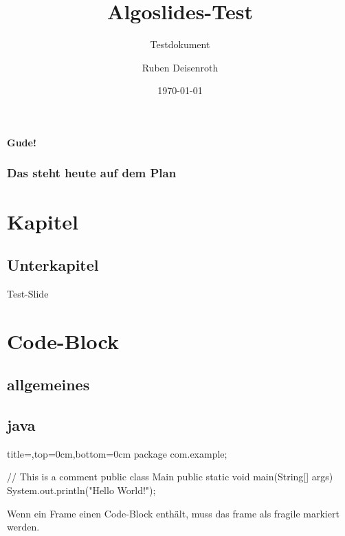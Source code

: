 \documentclass[
    ngerman,
    accentcolor=3b,
    fontsize=12pt,
    a4paper,
    aspectratio=169,
    colorback=true,
    fancy_row_colors,
    leqno,
    fleqn,
    boxarc,
    fleqn,
]{algoslides}
\title{Algoslides-Test}
\subtitle{Testdokument}
\author{Ruben Deisenroth}
\date{\today}
\begin{document}

    \maketitle{}

    \begin{frame}[c]
        \centering\huge\textbf{Gude!}
    \end{frame}

    \begin{frame}
        \frametitle{Das steht heute auf dem Plan}
        \tableofcontents[subsubsectionstyle=hide]
    \end{frame}


    \section{Kapitel}
    \subsection{Unterkapitel}

    \begin{frame}
        \slidehead{}
        Test-Slide
    \end{frame}

    \section{Code-Block} \subsection{allgemeines} \subsection{java}

    \begin{frame}[fragile,c]
        \slidehead{}
        \begin{codeBlock}[]{title=,top=0cm,bottom=0cm}
        package com.example;

        // This is a comment
        public class Main {
            public static void main(String[] args) {
                System.out.println("Hello World!");
            }
        }
    \end{codeBlock}
        \begin{defBox}
            Wenn ein Frame einen Code-Block enthält, muss das frame als fragile markiert werden.
        \end{defBox}
    \end{frame}
\end{document}
